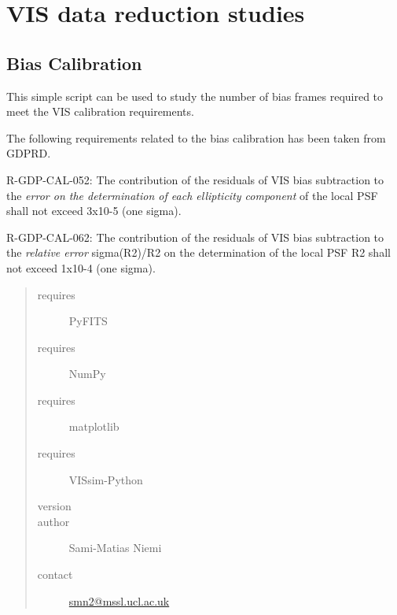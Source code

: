 \documentclass[a4paper,11pt,english]{sphinxmanual}
\begin{document}
\section{VIS data reduction studies}
\label{reduction:vis-data-reduction-studies}\label{reduction:module-analysis.biasCalibration}

\subsection{Bias Calibration}
\label{reduction:bias-calibration}
This simple script can be used to study the number of bias frames required to meet the VIS calibration requirements.

The following requirements related to the bias calibration has been taken from GDPRD.

R-GDP-CAL-052:
The contribution of the residuals of VIS bias subtraction to the \emph{error on the determination of each ellipticity
component} of the local PSF shall not exceed 3x10-5 (one sigma).

R-GDP-CAL-062:
The contribution of the residuals of VIS bias subtraction to the \emph{relative error} sigma(R2)/R2 on the determination of
the local PSF R2 shall not exceed 1x10-4 (one sigma).
\begin{quote}\begin{description}
\item[{requires}] \leavevmode
PyFITS

\item[{requires}] \leavevmode
NumPy

\item[{requires}] \leavevmode
matplotlib

\item[{requires}] \leavevmode
VISsim-Python

\item[{version}] 

\item[{author}] \leavevmode
Sami-Matias Niemi

\item[{contact}] \leavevmode
\href{mailto:smn2@mssl.ucl.ac.uk}{smn2@mssl.ucl.ac.uk}

\end{description}\end{quote}
\end{document}
